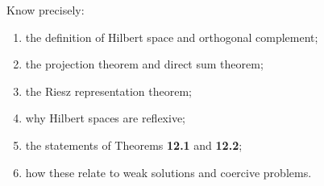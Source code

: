 \documentclass[header={Lecture 8 Exam Study Notes}]{study-note}
\begin{document}
\begin{focusbox}
Know precisely:
\begin{enumerate}
\item the definition of Hilbert space and orthogonal complement;
\item the projection theorem and direct sum theorem;
\item the Riesz representation theorem;
\item why Hilbert spaces are reflexive;
\item the statements of Theorems \textbf{12.1} and \textbf{12.2};
\item how these relate to weak solutions and coercive problems.
\end{enumerate}
\end{focusbox}
\end{document}
